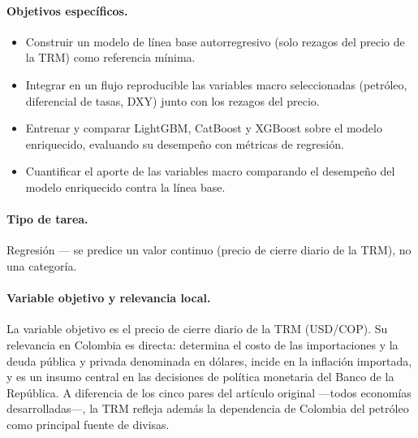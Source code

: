 \documentclass[11pt,letterpaper]{article}
\begin{document}
  \paragraph{Objetivos específicos.}
  \begin{itemize}[leftmargin=1.2em]
    \item Construir un modelo de línea base autorregresivo (solo rezagos del precio de la TRM) como referencia mínima.
    \item Integrar en un flujo reproducible las variables macro seleccionadas (petróleo, diferencial de tasas, DXY) junto con los rezagos del precio.
    \item Entrenar y comparar LightGBM, CatBoost y XGBoost sobre el modelo enriquecido, evaluando su desempeño con métricas de regresión.
    \item Cuantificar el aporte de las variables macro comparando el desempeño del modelo enriquecido contra la línea base.
  \end{itemize}

  \paragraph{Tipo de tarea.} Regresión --- se predice un valor continuo (precio de cierre diario de la TRM), no una categoría.

  \paragraph{Variable objetivo y relevancia local.} La variable objetivo es el precio de cierre diario de la TRM (USD/COP). Su relevancia en Colombia es directa: determina el costo de las importaciones y la deuda pública y privada denominada en dólares, incide en la inflación importada, y es un insumo central en las decisiones de política monetaria del Banco de la República. A diferencia de los cinco pares del artículo original ---todos economías desarrolladas---, la TRM refleja además la dependencia de Colombia del petróleo como principal fuente de divisas.
\end{document}
